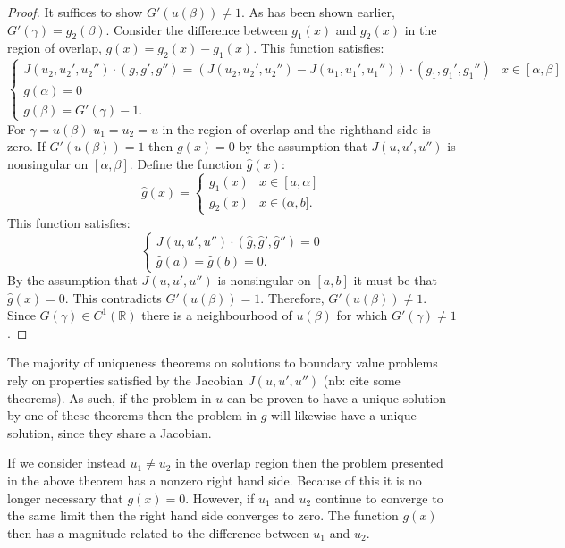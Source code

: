 \documentclass{book}
\begin{document}
\begin{proof}
It suffices to show $G'(u(\beta)) \neq 1$.
As has been shown earlier, $G'(\gamma) = g_2(\beta)$.
Consider the difference between $g_1(x)$ and $g_2(x)$ in the region of overlap, $g(x) = g_2(x) - g_1(x)$.
This function satisfies:
\begin{equation*}
\begin{cases} J(u_2,u_2',u_2'') \cdot (g, g', g'') = \left ( J(u_2, u_2', u_2'') - J(u_1, u_1', u_1'') \right ) \cdot (g_1, g_1', g_1'') & x \in [\alpha, \beta] \\ g(\alpha) = 0 \\ g(\beta) = G'(\gamma) - 1. \end{cases}
\end{equation*}
For $\gamma = u(\beta)$ $u_1 = u_2 = u$ in the region of overlap and the righthand side is zero.
If $G'(u(\beta)) = 1$ then $g(x) = 0$ by the assumption that $J(u,u',u'')$ is nonsingular on $[\alpha,\beta]$.
Define the function $\hat{g}(x)$:
\begin{equation*}
\hat{g}(x) = \begin{cases} g_1(x) & x \in [a,\alpha] \\ g_2(x) & x \in (\alpha,b]. \end{cases}
\end{equation*}
This function satisfies:
\begin{equation*}
\begin{cases} J(u,u',u'') \cdot (\hat{g},\hat{g}',\hat{g}'') = 0 \\ \hat{g}(a) = \hat{g}(b) = 0. \end{cases}
\end{equation*}
By the assumption that $J(u,u',u'')$ is nonsingular on $[a,b]$ it must be that $\hat{g}(x) = 0$.
This contradicts $G'(u(\beta)) = 1$.
Therefore, $G'(u(\beta)) \neq 1$.
Since $G(\gamma) \in C^1(\mathbb{R})$ there is a neighbourhood of $u(\beta)$ for which $G'(\gamma) \neq 1$.
\end{proof}

The majority of uniqueness theorems on solutions to boundary value problems rely on properties satisfied by the Jacobian $J(u,u',u'')$ (nb: cite some theorems).
As such, if the problem in $u$ can be proven to have a unique solution by one of these theorems then the problem in $g$ will likewise have a unique solution, since they share a Jacobian.

If we consider instead $u_1 \neq u_2$ in the overlap region then the problem presented in the above theorem has a nonzero right hand side.
Because of this it is no longer necessary that $g(x) = 0$.
However, if $u_1$ and $u_2$ continue to converge to the same limit then the right hand side converges to zero.
The function $g(x)$ then has a magnitude related to the difference between $u_1$ and $u_2$.
\end{document}
